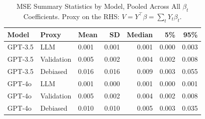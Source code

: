 \begin{table}

\caption{MSE Summary Statistics by Model, Pooled Across All $\beta_{t}$ Coefficients. Proxy on the RHS: $V = Y^\top \beta = \sum_{t} Y_t \beta_t$.}
\centering
\begin{tabular}[t]{lllrrrr}
\toprule
Model & Proxy & Mean & SD & Median & 5\% & 95\%\\
\midrule
GPT-3.5 & LLM & 0.001 & 0.001 & 0.001 & 0.000 & 0.003\\
GPT-3.5 & Validation & 0.005 & 0.002 & 0.004 & 0.002 & 0.008\\
GPT-3.5 & Debiased & 0.016 & 0.016 & 0.009 & 0.003 & 0.055\\
GPT-4o & LLM & 0.001 & 0.000 & 0.001 & 0.000 & 0.001\\
GPT-4o & Validation & 0.005 & 0.002 & 0.004 & 0.002 & 0.008\\
GPT-4o & Debiased & 0.010 & 0.010 & 0.005 & 0.003 & 0.035\\
\bottomrule
\end{tabular}
\end{table}
